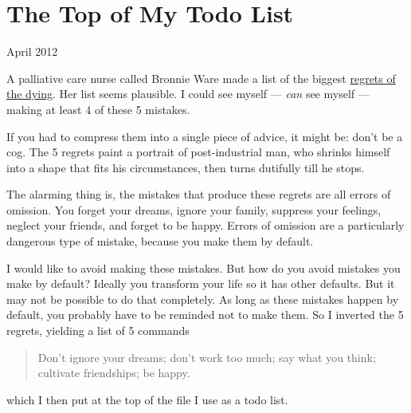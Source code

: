 \chapter{The Top of My Todo List}

April 2012

A palliative care nurse called Bronnie Ware made a list of the biggest
\href{http://bronnieware.com/regrets-of-the-dying/}{regrets of the
dying}. Her list seems plausible. I could see myself --- \emph{can} see
myself --- making at least 4 of these 5 mistakes.

If you had to compress them into a single piece of advice, it might be:
don't be a cog. The 5 regrets paint a portrait of post-industrial man,
who shrinks himself into a shape that fits his circumstances, then turns
dutifully till he stops.

The alarming thing is, the mistakes that produce these regrets are all
errors of omission. You forget your dreams, ignore your family, suppress
your feelings, neglect your friends, and forget to be happy. Errors of
omission are a particularly dangerous type of mistake, because you make
them by default.

I would like to avoid making these mistakes. But how do you avoid
mistakes you make by default? Ideally you transform your life so it has
other defaults. But it may not be possible to do that completely. As
long as these mistakes happen by default, you probably have to be
reminded not to make them. So I inverted the 5 regrets, yielding a list
of 5 commands

\begin{quote}
Don't ignore your dreams; don't work too much; say what you think;
cultivate friendships; be happy.
\end{quote}

which I then put at the top of the file I use as a todo list.